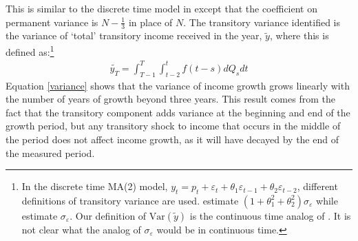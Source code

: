 \documentclass[titlepage]{\econtex}\newcommand{\texname}{ConsumptionHeterogeneity}
\begin{document}
This is similar to the discrete time model in \cite{carroll_nature_1997} except that the coefficient on permanent variance is $N-\frac{1}{3}$ in place of $N$. The transitory variance identified is the variance of `total' transitory income received in the year, $\tilde{y}$, where this is defined as:\footnote{In the discrete time MA(2) model, $y_t = p_t + \varepsilon_t + \theta_1 \varepsilon_{t-1} + \theta_2 \varepsilon_{t-2}$, different definitions of transitory variance are used. \cite{carroll_nature_1997} estimate $(1+\theta_1^2 + \theta_2^2)\sigma_{\varepsilon}$ while \cite{blundell_consumption_2008} estimate $\sigma_{\varepsilon}$. Our definition of $\mathrm{Var}(\tilde{y})$ is the continuous time analog of \cite{carroll_nature_1997}. It is not clear what the analog of $\sigma_{\varepsilon}$ would be in continuous time.}
\begin{align}
\tilde{y_T} = \int_{T-1}^{T}\int_{t-2}^{t} f(t-s)dQ_s dt \label{tot_income}
\end{align}
Equation \ref{variance} shows that the variance of income growth grows linearly with the number of years of growth beyond three years. This result comes from the fact that the transitory component adds variance at the beginning and end of the growth period, but any transitory shock to income that occurs in the middle of the period does not affect income growth, as it will have decayed by the end of the measured period.
\end{document}
